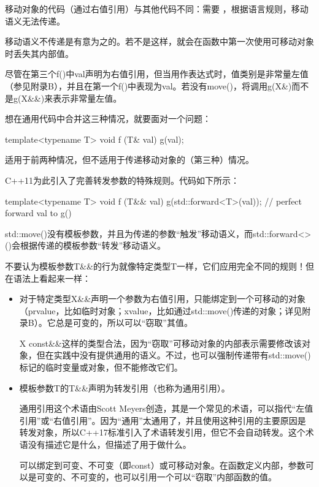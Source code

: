 移动对象的代码（通过右值引用）与其他代码不同：需要 ，根据语言规则，移动语义无法传递。

\begin{notice}
移动语义不传递是有意为之的。若不是这样，就会在函数中第一次使用可移动对象时丢失其内部值。
\end{notice}

尽管在第三个f()中val声明为右值引用，但当用作表达式时，值类别是非常量左值（参见附录B），并且在第一个f()中表现为val。若没有move()，将调用g(X\&)而不是g(X\&\&)来表示非常量左值。

想在通用代码中合并这三种情况，就要面对一个问题：

\begin{cpp}
template<typename T>
void f (T& val) {
	g(val);
}
\end{cpp}

适用于前两种情况，但不适用于传递移动对象的（第三种）情况。

C++11为此引入了完善转发参数的特殊规则。代码如下所示：

\begin{cpp}
template<typename T>
void f (T&& val) {
	g(std::forward<T>(val)); // perfect forward val to g()
}
\end{cpp}

std::move()没有模板参数，并且为传递的参数“触发”移动语义，而std::forward<>()会根据传递的模板参数“转发”移动语义。

不要认为模板参数T\&\&的行为就像特定类型T一样，它们应用完全不同的规则！但在语法上看起来一样：

\begin{itemize}
\item 
对于特定类型X\&\&声明一个参数为右值引用，只能绑定到一个可移动的对象（prvalue，比如临时对象；xvalue，比如通过std::move()传递的对象；详见附录B）。它总是可变的，所以可以“窃取”其值。

\begin{notice}
X const\&\&这样的类型合法，因为“窃取”可移动对象的内部表示需要修改该对象，但在实践中没有提供通用的语义。不过，也可以强制传递带有std::move()标记的临时变量或对象，但不能修改它们。
\end{notice}

\item 
模板参数T的T\&\&声明为转发引用（也称为通用引用）。

\begin{notice}
通用引用这个术语由Scott Meyers创造，其是一个常见的术语，可以指代“左值引用”或“右值引用”。因为“通用”太通用了，并且使用这种引用的主要原因是转发对象，所以C++17标准引入了术语转发引用，但它不会自动转发。这个术语没有描述它是什么，但描述了用于做什么。
\end{notice}

可以绑定到可变、不可变（即const）或可移动对象。在函数定义内部，参数可以是可变的、不可变的，也可以引用一个可以“窃取”内部函数的值。
\end{itemize}

